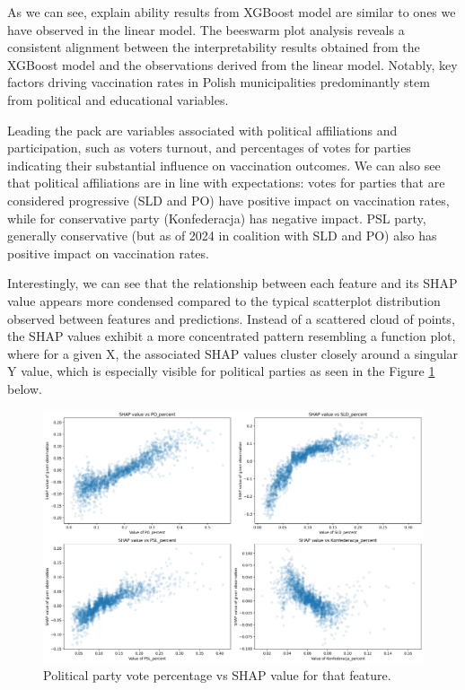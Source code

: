 \documentclass[a4paper,12pt]{article} %
\begin{document}
  As we can see, explain ability results from XGBoost model are similar to ones we have observed in the linear model. The beeswarm plot analysis reveals a consistent alignment between the interpretability results obtained from the XGBoost model and the observations derived from the linear model. Notably, key factors driving vaccination rates in Polish municipalities predominantly stem from political and educational variables.

  Leading the pack are variables associated with political affiliations and participation, such as voters turnout, and percentages of votes for parties indicating their substantial influence on vaccination outcomes. We can also see that political affiliations are in line with expectations: votes for parties that are considered progressive (SLD and PO) have positive impact on vaccination rates, while for conservative party (Konfederacja) has negative impact. PSL party, generally conservative (but as of 2024 in coalition with SLD and PO) also has positive impact on vaccination rates. 
  
  Interestingly, we can see that the relationship between each feature and its SHAP value appears more condensed compared to the typical scatterplot distribution observed between features and predictions. Instead of a scattered cloud of points, the SHAP values exhibit a more concentrated pattern resembling a function plot, where for a given X, the associated SHAP values cluster closely around a singular Y value, which is especially visible for political parties as seen in the Figure \ref{fig:parties_partial} below. 
  

  \begin{figure}[htbp]
    \centering
    \includegraphics[width=1\textwidth]{assets/parties_partial.png}
    \caption{Political party vote percentage vs SHAP value for that feature.}
    \label{fig:parties_partial}
  \end{figure}
\end{document}
